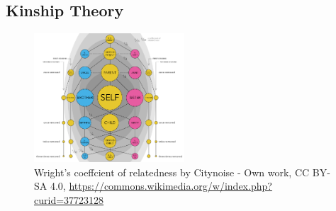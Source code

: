 \documentclass[]{final_report}
\begin{document}
\subsection{Kinship Theory}
\label{appendix:kin}
\begin{figure}
	\center
	\includegraphics[width=0.5\textwidth]{coefrelate.png}
	\caption{Wright's coeffcient of relatedness by Citynoise - Own work, CC BY-SA 4.0, \url{https://commons.wikimedia.org/w/index.php?curid=37723128}}
	\label{fig:coefrelate}
\end{figure}
\par
\end{document}
